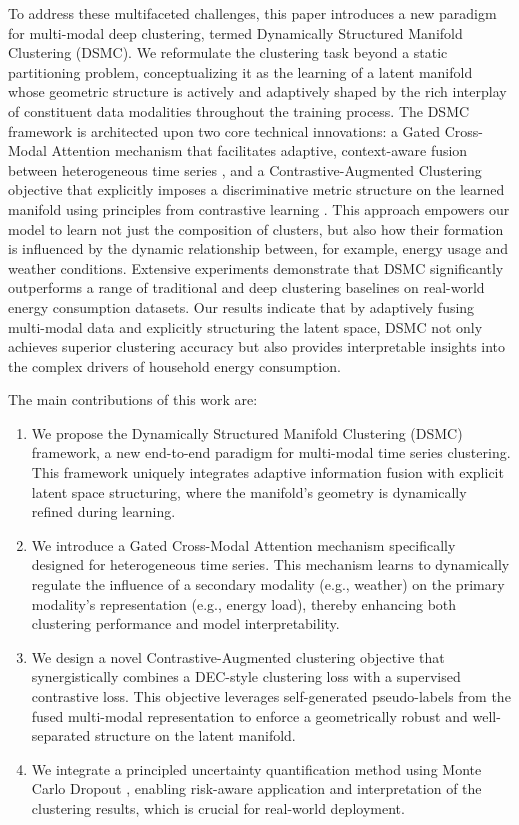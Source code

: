\documentclass[journal]{IEEEtran}
\begin{document}
To address these multifaceted challenges, this paper introduces a new paradigm for multi-modal deep clustering, termed Dynamically Structured Manifold Clustering (DSMC). We reformulate the clustering task beyond a static partitioning problem, conceptualizing it as the learning of a latent manifold whose geometric structure is actively and adaptively shaped by the rich interplay of constituent data modalities throughout the training process. The DSMC framework is architected upon two core technical innovations: a Gated Cross-Modal Attention mechanism that facilitates adaptive, context-aware fusion between heterogeneous time series \cite{attention_is_all_you_need}, and a Contrastive-Augmented Clustering objective that explicitly imposes a discriminative metric structure on the learned manifold using principles from contrastive learning \cite{contrastive_learning_chen}. This approach empowers our model to learn not just the composition of clusters, but also how their formation is influenced by the dynamic relationship between, for example, energy usage and weather conditions. Extensive experiments demonstrate that DSMC significantly outperforms a range of traditional and deep clustering baselines on real-world energy consumption datasets. Our results indicate that by adaptively fusing multi-modal data and explicitly structuring the latent space, DSMC not only achieves superior clustering accuracy but also provides interpretable insights into the complex drivers of household energy consumption.

The main contributions of this work are:
\begin{enumerate}
    \item We propose the Dynamically Structured Manifold Clustering (DSMC) framework, a new end-to-end paradigm for multi-modal time series clustering. This framework uniquely integrates adaptive information fusion with explicit latent space structuring, where the manifold's geometry is dynamically refined during learning.
    \item We introduce a Gated Cross-Modal Attention mechanism specifically designed for heterogeneous time series. This mechanism learns to dynamically regulate the influence of a secondary modality (e.g., weather) on the primary modality's representation (e.g., energy load), thereby enhancing both clustering performance and model interpretability.
    \item We design a novel Contrastive-Augmented clustering objective that synergistically combines a DEC-style clustering loss with a supervised contrastive loss. This objective leverages self-generated pseudo-labels from the fused multi-modal representation to enforce a geometrically robust and well-separated structure on the latent manifold.
    \item We integrate a principled uncertainty quantification method using Monte Carlo Dropout \cite{mc_dropout_gal}, enabling risk-aware application and interpretation of the clustering results, which is crucial for real-world deployment.
\end{enumerate}
\end{document}
